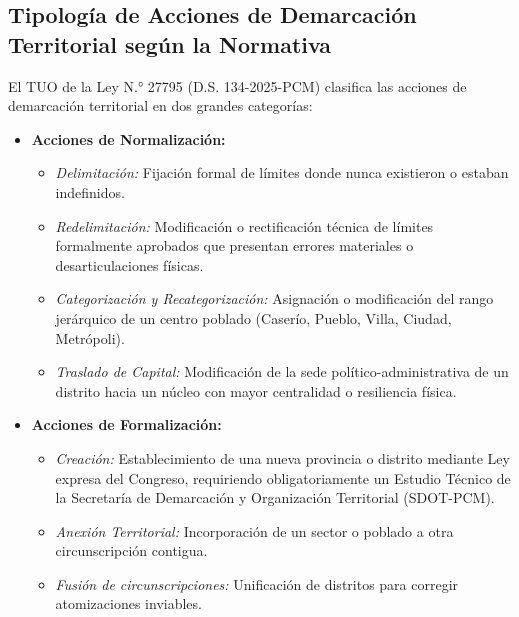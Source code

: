 \documentclass[11pt,a4paper]{article}
\begin{document}
\subsection{Tipología de Acciones de Demarcación Territorial según la Normativa}
El TUO de la Ley N.° 27795 (D.S. 134-2025-PCM) clasifica las acciones de demarcación territorial en dos grandes categorías:
\begin{itemize}[leftmargin=*]
    \item \textbf{Acciones de Normalización:}
    \begin{itemize}
        \item \emph{Delimitación:} Fijación formal de límites donde nunca existieron o estaban indefinidos.
        \item \emph{Redelimitación:} Modificación o rectificación técnica de límites formalmente aprobados que presentan errores materiales o desarticulaciones físicas.
        \item \emph{Categorización y Recategorización:} Asignación o modificación del rango jerárquico de un centro poblado (Caserío, Pueblo, Villa, Ciudad, Metrópoli).
        \item \emph{Traslado de Capital:} Modificación de la sede político-administrativa de un distrito hacia un núcleo con mayor centralidad o resiliencia física.
    \end{itemize}
    \item \textbf{Acciones de Formalización:}
    \begin{itemize}
        \item \emph{Creación:} Establecimiento de una nueva provincia o distrito mediante Ley expresa del Congreso, requiriendo obligatoriamente un Estudio Técnico de la Secretaría de Demarcación y Organización Territorial (SDOT-PCM).
        \item \emph{Anexión Territorial:} Incorporación de un sector o poblado a otra circunscripción contigua.
        \item \emph{Fusión de circunscripciones:} Unificación de distritos para corregir atomizaciones inviables.
    \end{itemize}
\end{itemize}
\end{document}
